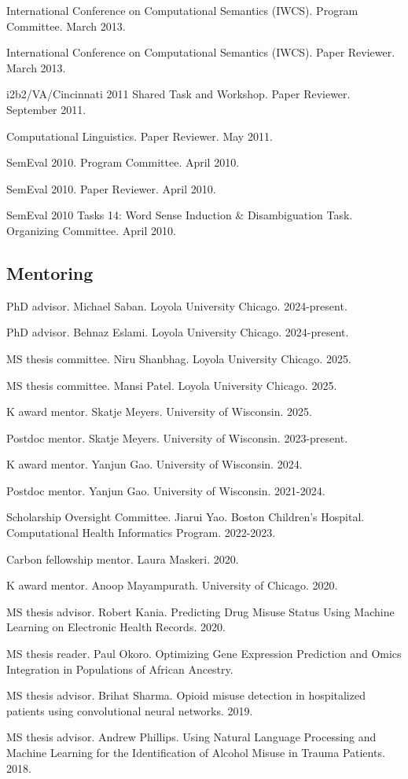 \documentclass[letterpaper]{article}
\renewenvironment{itemize}{
  \begin{list}{}{
    \setlength{\leftmargin}{1.5em}
  }
}{
  \end{list}
}
\begin{document}
\begin{itemize}
\item International Conference on Computational Semantics (IWCS). Program Committee. March 2013.
\item International Conference on Computational Semantics (IWCS). Paper Reviewer. March 2013.
\item i2b2/VA/Cincinnati 2011 Shared Task and Workshop. Paper Reviewer. September 2011.
\item Computational Linguistics. Paper Reviewer. May 2011.
\item SemEval 2010. Program Committee. April 2010.
\item SemEval 2010. Paper Reviewer. April 2010.
\item SemEval 2010 Tasks 14: Word Sense Induction \& Disambiguation Task. Organizing Committee. April 2010.
\end{itemize}

\subsection*{Mentoring}

\begin{itemize}
\item PhD advisor. Michael Saban. Loyola University Chicago. 2024-present.
\item PhD advisor. Behnaz Eslami. Loyola University Chicago. 2024-present.
\item MS thesis committee. Niru Shanbhag. Loyola University Chicago. 2025.
\item MS thesis committee. Mansi Patel. Loyola University Chicago. 2025.
\item K award mentor. Skatje Meyers. University of Wisconsin. 2025.
\item Postdoc mentor. Skatje Meyers. University of Wisconsin. 2023-present.
\item K award mentor. Yanjun Gao. University of Wisconsin. 2024.
\item Postdoc mentor. Yanjun Gao. University of Wisconsin. 2021-2024.
\item Scholarship Oversight Committee. Jiarui Yao. Boston Children's Hospital. Computational Health Informatics Program. 2022-2023.
\item Carbon fellowship mentor. Laura Maskeri. 2020.
\item K award mentor. Anoop Mayampurath. University of Chicago. 2020.
\item MS thesis advisor. Robert Kania. Predicting Drug Misuse Status Using Machine Learning on Electronic Health Records. 2020.
\item MS thesis reader. Paul Okoro. Optimizing Gene Expression Prediction and Omics Integration in Populations of African Ancestry.
\item MS thesis advisor. Brihat Sharma. Opioid misuse detection in hospitalized patients using convolutional neural networks. 2019.
\item MS thesis advisor. Andrew Phillips. Using Natural Language Processing and Machine Learning for the Identification of Alcohol Misuse in Trauma Patients. 2018.
\end{itemize}
\end{document}
